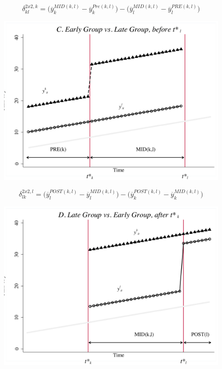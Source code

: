 \documentclass{beamer}
\begin{document}
\begin{frame}[plain]

$$\delta_{kl}^{2x2,k} = \bigg ( \overline{y}_k^{MID(k,l)} - \overline{y}_k^{Pre(k,l)} \bigg ) - \bigg ( \overline{y}_l^{MID(k,l)} - \overline{y}_l^{PRE(k,l)} \bigg ) $$

	\begin{figure}
	\includegraphics[scale=0.45]{./lecture_includes/bacon_goodman_6.png}
	\end{figure}

\end{frame}

\begin{frame}[plain]
$$\delta_{lk}^{2x2,l} = \bigg ( \overline{y}_l^{POST(k,l)} - \overline{y}_l^{MID(k,l)} \bigg ) - \bigg ( \overline{y}_k^{POST(k,l)} - \overline{y}_k^{MID(k,l)} \bigg ) $$

	\begin{figure}
	\includegraphics[scale=0.4]{./lecture_includes/bacon_goodman_7.png}
	\end{figure}

\end{frame}
\end{document}
